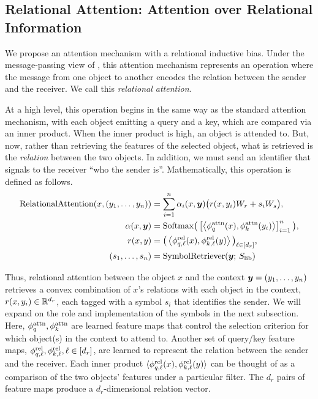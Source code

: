 \subsection{Relational Attention: Attention over Relational Information}

We propose an attention mechanism with a relational inductive bias. Under the message-passing view of , this attention mechanism represents an operation where the message from one object to another encodes the relation between the sender and the receiver. We call this \textit{relational attention}.

At a high level, this operation begins in the same way as the standard attention mechanism, with each object emitting a query and a key, which are compared via an inner product. When the inner product is high, an object is attended to. But, now, rather than retrieving the features of the selected object, what is retrieved is the \textit{relation} between the two objects. In addition, we must send an identifier that signals to the receiver ``who the sender is''. Mathematically, this operation is defined as follows.
\begin{equation}\label{eq:rel_attn}
  \begin{split}
    \mathrm{RelationalAttention}(x, (y_1, \ldots, y_n)) &= \sum_{i=1}^{n} \alpha_i(x, \bm{y}) \big(r(x, y_i) W_r + s_i W_s\big), \\
    \alpha(x, \bm{y}) &= \mathrm{Softmax}\big(\left[\left \langle \phi_q^{\mathrm{attn}}(x), \phi_k^{\mathrm{attn}}(y_i) \right\rangle\right]_{i=1}^{n}\big), \\
    r(x, y) &= \big(\left \langle \phi_{q, \ell}^{\mathrm{rel}}(x), \phi_{k, \ell}^{\mathrm{rel}}(y) \right\rangle\big)_{\ell \in [d_r]}, \\
    (s_1, \ldots, s_n) &= \mathrm{SymbolRetriever}(\bm{y};\,S_\mathrm{lib})
  \end{split}
\end{equation}

Thus, relational attention between the object $x$ and the context $\bm{y} = (y_1, \ldots, y_n)$ retrieves a convex combination of $x$'s relations with each object in the context, $r(x, y_i) \in \mathbb{R}^{d_r}$, each tagged with a symbol $s_i$ that identifies the sender. We will expand on the role and implementation of the symbols in the next subsection. Here, $\phi_q^{\mathrm{attn}}, \phi_k^{\mathrm{attn}}$ are learned feature maps that control the selection criterion for which object(s) in the context to attend to. Another set of query/key feature maps, $\phi_{q, \ell}^{\mathrm{rel}}, \phi_{k, \ell}^{\mathrm{rel}}, \ell \in [d_r]$, are learned to represent the relation between the sender and the receiver. Each inner product $\langle \phi_{q, \ell}^{\mathrm{rel}}(x), \phi_{k, \ell}^{\mathrm{rel}}(y) \rangle$ can be thought of as a comparison of the two objects' features under a particular filter. The $d_r$ pairs of feature maps produce a $d_r$-dimensional relation vector.

